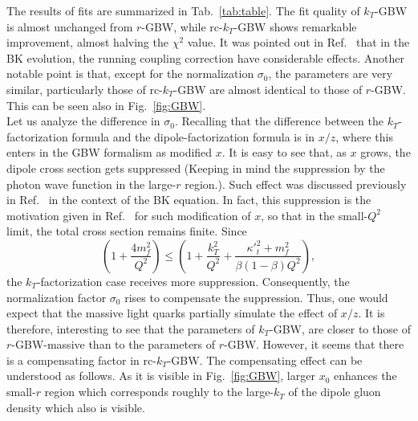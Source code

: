 \documentclass[12pt]{article}
\numberwithin{equation}{section}
\numberwithin{table}{section}
\numberwithin{figure}{section}
\newcommand{\comment}[1]{\texttt{\color{red}#1}}
\begin{document}
The results of fits are summarized in Tab.~\ref{tab:table}. 
The fit quality of $k_T$-GBW is almost unchanged from $r$-GBW, while rc-$k_T$-GBW shows remarkable improvement, almost halving the $\chi^2$ value.
It was pointed out in Ref.~\cite{Albacete:2004gw,Albacete:2007yr,Albacete:2010sy} that in the BK evolution, the running coupling correction have considerable effects.
Another notable point is that, except for the normalization $\sigma_0$, the parameters are very similar, particularly those of rc-$k_T$-GBW are almost identical to those of $r$-GBW. This can be seen also in Fig.~\ref{fig:GBW}. \\
Let us analyze the difference in $\sigma_0$. 
Recalling that the difference between the $k_T$-factorization formula and the dipole-factorization formula is in $x/z$, where this enters in the GBW formalism as modified $x$. It is easy to see that, as $x$ grows, the dipole cross section gets suppressed (Keeping in mind the suppression by the photon wave function in the large-$r$ region.). Such effect was discussed previously in Ref.~\cite{Kutak:2004ym} in the context of the BK equation. In fact, this suppression is the motivation given in Ref.~\cite{Golec-Biernat:1998zce} for such modification of $x$, so that in the small-$Q^2$ limit, the total cross section remains finite.    
Since 
\begin{equation}
\left(1+\frac{4 m_f^2}{Q^2}\right)\leq\left(1+\frac{k_T^2}{Q^2}+\frac{{\kappa'}_t^2+m_f^2}{\beta(1-\beta)Q^2}\right),
\end{equation}
the $k_T$-factorization case receives more suppression. Consequently, the normalization factor $\sigma_0$ rises to compensate the suppression. Thus, one would expect that the massive light quarks partially simulate the effect of $x/z$.
It is therefore, interesting to see that the parameters of $k_T$-GBW, are closer to those of $r$-GBW-massive than to the parameters of $r$-GBW.    
However, it seems that there is a compensating factor in rc-$k_T$-GBW. 
The compensating effect can be understood as follows. As it is visible in  Fig.~\ref{fig:GBW}, larger $x_0$ enhances the small-$r$ region which corresponds roughly to the large-$k_T$ of the dipole gluon density which also is visible. 
\end{document}
